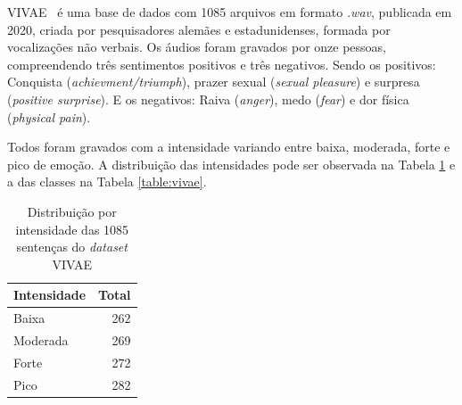\acrlong{VIVAE}~\cite{16} é uma base de dados com 1085 arquivos em formato \textit{.wav}, publicada em 2020, criada por pesquisadores alemães e estadunidenses, formada por vocalizações não verbais. Os áudios foram gravados por onze pessoas, compreendendo três sentimentos positivos e três negativos. Sendo os positivos: Conquista (\textit{achievment/triumph}), prazer sexual (\textit{sexual pleasure}) e surpresa (\textit{positive surprise}). E os negativos: Raiva (\textit{anger}), medo (\textit{fear}) e dor física (\textit{physical pain}).

Todos foram gravados com a intensidade variando entre baixa, moderada, forte e pico de emoção. A distribuição das intensidades pode ser observada na Tabela \ref{table:vivaeintensidade} e a das classes na Tabela \ref{table:vivae}.

\begin{table}[]
    \centering
    \caption{Distribuição por intensidade das 1085 sentenças do \textit{dataset} VIVAE}
    \begin{tabular}{|l|r|}
    \hline
        Intensidade & Total  \\ \hline
        Baixa & 262  \\ \hline
        Moderada & 269  \\ \hline
        Forte & 272  \\ \hline
        Pico & 282  \\ \hline
    \end{tabular}\label{table:vivaeintensidade}
\end{table}


